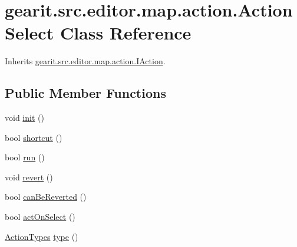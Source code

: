 \hypertarget{classgearit_1_1src_1_1editor_1_1map_1_1action_1_1_action_select}{\section{gearit.\+src.\+editor.\+map.\+action.\+Action\+Select Class Reference}
\label{classgearit_1_1src_1_1editor_1_1map_1_1action_1_1_action_select}
}


Inherits \hyperlink{interfacegearit_1_1src_1_1editor_1_1map_1_1action_1_1_i_action}{gearit.\+src.\+editor.\+map.\+action.\+I\+Action}.

\subsection*{Public Member Functions}
\begin{DoxyCompactItemize}
\item 
void \hyperlink{classgearit_1_1src_1_1editor_1_1map_1_1action_1_1_action_select_a986a31c380115f56a5c183ce3ded4099}{init} ()
\item 
bool \hyperlink{classgearit_1_1src_1_1editor_1_1map_1_1action_1_1_action_select_a1eb1360e7f90c79f57b9fdbfb2698b91}{shortcut} ()
\item 
bool \hyperlink{classgearit_1_1src_1_1editor_1_1map_1_1action_1_1_action_select_ae732857141a641441a96029ed95b425e}{run} ()
\item 
void \hyperlink{classgearit_1_1src_1_1editor_1_1map_1_1action_1_1_action_select_ab67fe6575e2039e7254405286c9a6a33}{revert} ()
\item 
bool \hyperlink{classgearit_1_1src_1_1editor_1_1map_1_1action_1_1_action_select_acb63ce2aa29a6490674b427a03d09628}{can\+Be\+Reverted} ()
\item 
bool \hyperlink{classgearit_1_1src_1_1editor_1_1map_1_1action_1_1_action_select_a99569582754b289ff5461ce6e91abdfb}{act\+On\+Select} ()
\item 
\hyperlink{namespacegearit_1_1src_1_1editor_1_1map_1_1action_af036712a7d960b13d1e31954e65c00e3}{Action\+Types} \hyperlink{classgearit_1_1src_1_1editor_1_1map_1_1action_1_1_action_select_afa7512cd4ae18ff2842a8336d2087cf1}{type} ()
\end{DoxyCompactItemize}


